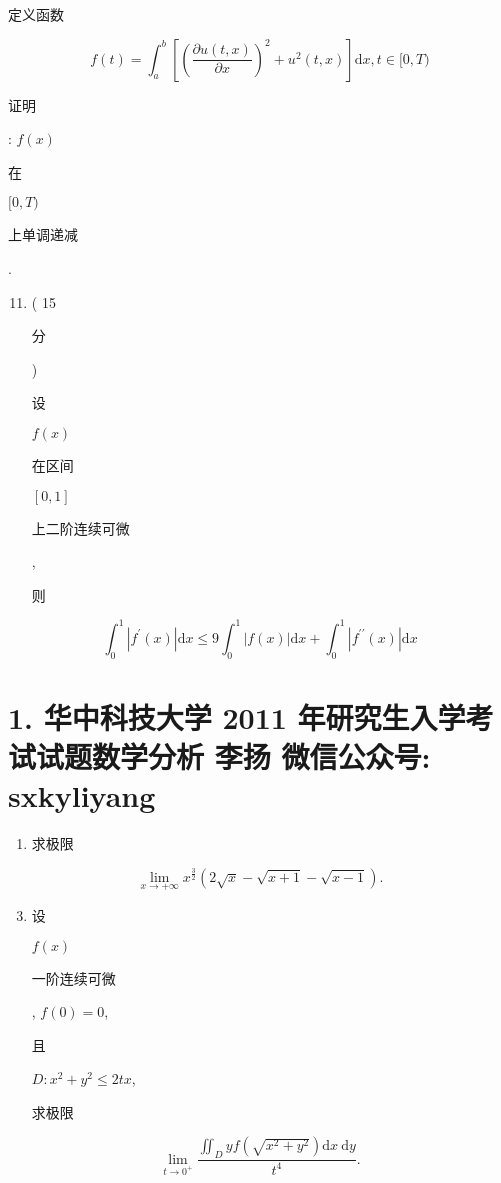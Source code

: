 \documentclass[10pt]{article}
\begin{document}
\begin{CJK}{UTF8}{mj}定义函数\end{CJK}
$$
f(t)=\int_{a}^{b}\left[\left(\frac{\partial u(t, x)}{\partial x}\right)^{2}+u^{2}(t, x)\right] \mathrm{d} x, t \in[0, T)
$$
\begin{CJK}{UTF8}{mj}证明\end{CJK}: $f(x)$ \begin{CJK}{UTF8}{mj}在\end{CJK} $[0, T)$ \begin{CJK}{UTF8}{mj}上单调递减\end{CJK}.

\begin{enumerate}
  \setcounter{enumi}{10}
  \item ( 15 \begin{CJK}{UTF8}{mj}分\end{CJK}) \begin{CJK}{UTF8}{mj}设\end{CJK} $f(x)$ \begin{CJK}{UTF8}{mj}在区间\end{CJK} $[0,1]$ \begin{CJK}{UTF8}{mj}上二阶连续可微\end{CJK}, \begin{CJK}{UTF8}{mj}则\end{CJK}
\end{enumerate}
$$
\int_{0}^{1}\left|f^{\prime}(x)\right| \mathrm{d} x \leq 9 \int_{0}^{1}|f(x)| \mathrm{d} x+\int_{0}^{1}\left|f^{\prime \prime}(x)\right| \mathrm{d} x
$$

\section{1. 华中科技大学 2011 年研究生入学考试试题数学分析 
 李扬 
 微信公众号: sxkyliyang}
\begin{enumerate}
  \item \begin{CJK}{UTF8}{mj}求极限\end{CJK}
\end{enumerate}
$$
\lim _{x \rightarrow+\infty} x^{\frac{3}{2}}(2 \sqrt{x}-\sqrt{x+1}-\sqrt{x-1}) .
$$

\begin{enumerate}
  \setcounter{enumi}{2}
  \item \begin{CJK}{UTF8}{mj}设\end{CJK} $f(x)$ \begin{CJK}{UTF8}{mj}一阶连续可微\end{CJK}, $f(0)=0$, \begin{CJK}{UTF8}{mj}且\end{CJK} $D: x^{2}+y^{2} \leq 2 t x$, \begin{CJK}{UTF8}{mj}求极限\end{CJK}
\end{enumerate}
$$
\lim _{t \rightarrow 0^{+}} \frac{\iint_{D} y f\left(\sqrt{x^{2}+y^{2}}\right) \mathrm{d} x \mathrm{~d} y}{t^{4}} .
$$
\end{document}
